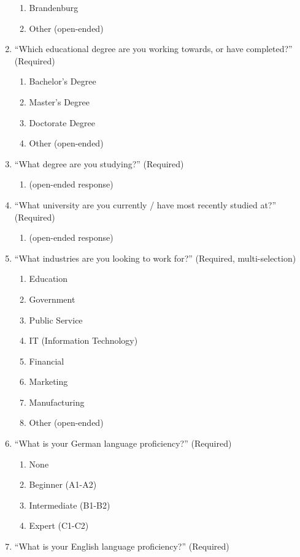 \begin{enumerate}
\begin{enumerate}
		\item	Brandenburg
		\item	Other (open-ended)
	\end{enumerate}
	\item “Which educational degree are you working towards, or have completed?”  (Required)
	\begin{enumerate}
		\item Bachelor's Degree
		\item Master's Degree
		\item Doctorate Degree
		\item Other (open-ended)
	\end{enumerate}
	\item “What degree are you studying?” (Required)
	\begin{enumerate}
		\item (open-ended response)
	\end{enumerate}
	\item “What university are you currently / have most recently studied at?” (Required)
	\begin{enumerate}
		\item (open-ended response)
	\end{enumerate}
	\item “What industries are you looking to work for?” (Required, multi-selection)
	\begin{enumerate}
		\item Education
		\item Government
		\item Public Service
		\item IT (Information Technology)
		\item Financial
		\item Marketing
		\item Manufacturing
		\item Other (open-ended)
	\end{enumerate}
	\item “What is your German language proficiency?” (Required)
	\begin{enumerate}
		\item None
		\item Beginner (A1-A2)
		\item Intermediate (B1-B2)
		\item Expert (C1-C2)
	\end{enumerate}
	\item “What is your English language proficiency?” (Required)
	\begin{enumerate}

\end{enumerate}
\end{enumerate}

